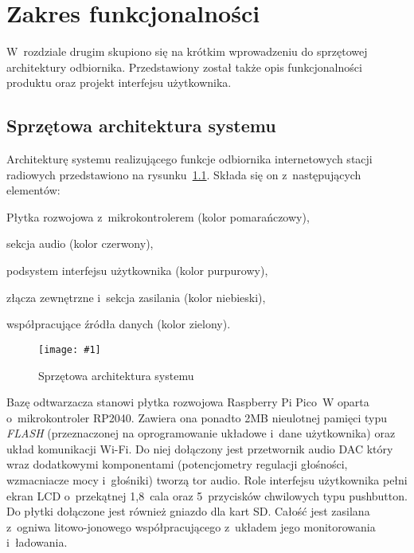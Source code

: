 \documentclass[polish]{aghengthesis}
\let\tempone\itemize
\let\temptwo\enditemize
\renewenvironment{itemize}{\tempone\setlength{\itemsep}{0cm}}{\temptwo}
\newcommand{\imgint}[4]{
	\begin{figure}[{#4}]
		\centering
		\texttt{[image: \#1]}
		\caption{#2}
		\label{#1}
	\end{figure}
}
\newcommand{\imgh}[3]{\imgint{#1}{#2}{#3}{H}}
\begin{document}
\cleardoublepage
\chapter{Zakres funkcjonalności}
	W~rozdziale drugim skupiono się na krótkim wprowadzeniu do sprzętowej architektury odbiornika. Przedstawiony został także opis funkcjonalności produktu oraz projekt interfejsu użytkownika.\\
	
	\section{Sprzętowa architektura systemu}
			Architekturę systemu realizującego funkcje odbiornika internetowych stacji radiowych przedstawiono na rysunku~\ref{2/PicoRadio-hw-blocks}. Składa się on z~następujących elementów:
			\begin{itemize}
				\item Płytka rozwojowa z~mikrokontrolerem (kolor \textcolor{io-fg-orange}{pomarańczowy}),
				\item sekcja audio (kolor \textcolor{io-fg-red}{czerwony}),
				\item podsystem interfejsu użytkownika (kolor \textcolor{io-fg-purple}{purpurowy}),
				\item złącza zewnętrzne i~sekcja zasilania (kolor \textcolor{io-fg-blue}{niebieski}),
				\item współpracujące źródła danych (kolor \textcolor{io-fg-green}{zielony}).
			\end{itemize}
			
			\imgh{2/PicoRadio-hw-blocks}{Sprzętowa architektura systemu}{0.95}
			
			\pagebreak
			Bazę odtwarzacza stanowi płytka rozwojowa Raspberry Pi Pico~W oparta o~mikrokontroler RP2040. Zawiera ona ponadto 2MB nieulotnej pamięci typu \textit{FLASH} (przeznaczonej na oprogramowanie układowe i~dane użytkownika) oraz układ komunikacji Wi-Fi. Do niej dołączony jest przetwornik audio DAC który wraz dodatkowymi komponentami (potencjometry regulacji głośności, wzmacniacze mocy i~głośniki) tworzą tor audio. Role interfejsu użytkownika pełni ekran LCD o~przekątnej 1,8~cala oraz 5~przycisków chwilowych typu pushbutton. Do płytki dołączone jest również gniazdo dla kart SD. Całość jest zasilana z~ogniwa litowo-jonowego współpracującego z~układem jego monitorowania i~ładowania. 
			$ $\\
			
\end{document}
